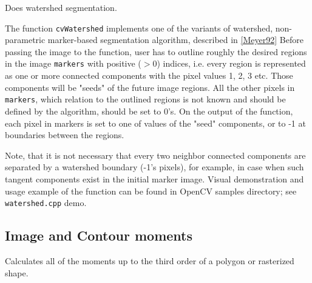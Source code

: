 
Does watershed segmentation.


\begin{description}
\end{description}

The function \texttt{cvWatershed} implements one of the variants
of watershed, non-parametric marker-based segmentation algorithm,
described in \href{Meyer92}{[Meyer92]} Before passing the image to the
function, user has to outline roughly the desired regions in the image
\texttt{markers} with positive ($>0$) indices, i.e. every region is
represented as one or more connected components with the pixel values
1, 2, 3 etc. Those components will be "seeds" of the future image
regions. All the other pixels in \texttt{markers}, which relation to the
outlined regions is not known and should be defined by the algorithm,
should be set to 0's. On the output of the function, each pixel in
markers is set to one of values of the "seed" components, or to -1 at
boundaries between the regions.

Note, that it is not necessary that every two neighbor connected
components are separated by a watershed boundary (-1's pixels), for
example, in case when such tangent components exist in the initial
marker image. Visual demonstration and usage example of the function
can be found in OpenCV samples directory; see \texttt{watershed.cpp} demo.

\subsection{Image and Contour moments}

\label{Moments}

Calculates all of the moments up to the third order of a polygon or rasterized shape.


\begin{description}
\end{description}

